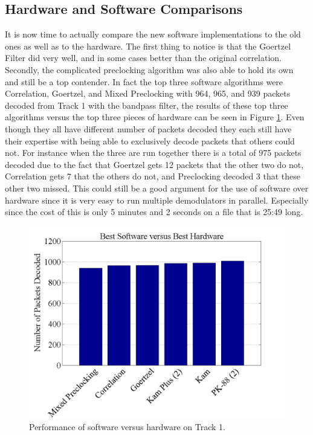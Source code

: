 \subsection{Hardware and Software Comparisons}
It is now time to actually compare the new software implementations to the old ones as well as to the hardware. The first thing to notice is that the Goertzel Filter did very well, and in some cases better than the original correlation. Secondly, the complicated preclocking algorithm was also able to hold its own and still be a top contender. In fact the top three software algorithms were Correlation, Goertzel, and Mixed Preclocking with 964, 965, and 939 packets decoded from Track 1 with the bandpass filter, the results of these top three algorithms versus the top three pieces of hardware can be seen in Figure \ref{bestHardSoft}. Even though they all have different number of packets decoded they each still have their expertise with being able to exclusively decode packets that others could not. For instance when the three are run together there is a total of 975 packets decoded due to the fact that Goertzel gets 12 packets that the other two do not, Correlation gets 7 that the others do not, and Preclocking decoded 3 that these other two missed. This could still be a good argument for the use of software over hardware since it is very easy to run multiple demodulators in parallel. Especially since the cost of this is only 5 minutes and 2 seconds on a file that is 25:49 long.

\begin{figure}
  \centering
	\includegraphics[width=0.75\linewidth]{images/BestSoftwareversusBestHardware.png} 
	\caption{Performance of software versus hardware on Track 1.}
   \label{bestHardSoft}
\end{figure}


